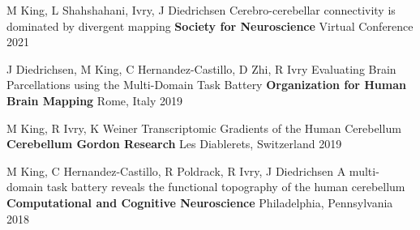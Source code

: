 \begin{cventries}

  \cventry
    {M King, L Shahshahani, Ivry, J Diedrichsen} %
    {Cerebro-cerebellar connectivity is dominated by divergent mapping} %
    {\textbf{Society for Neuroscience}} %
    {Virtual Conference} %
    {2021} %


  \cventry
    {J Diedrichsen, M King, C Hernandez-Castillo, D Zhi, R Ivry} %
    {Evaluating Brain Parcellations using the Multi-Domain Task Battery} %
    {\textbf{Organization for Human Brain Mapping}} %
    {Rome, Italy} %
    {2019} %
    
    
  \cventry
    {M King, R Ivry, K Weiner} %
    {Transcriptomic Gradients of the Human Cerebellum} %
    {\textbf{Cerebellum Gordon Research}} %
    {Les Diablerets, Switzerland} %
    {2019} %
    

  \cventry
    {M King, C Hernandez-Castillo, R Poldrack, R Ivry, J Diedrichsen} %
    {A multi-domain task battery reveals the functional topography of the human cerebellum} %
    {\textbf{Computational and Cognitive Neuroscience}} %
    {Philadelphia, Pennsylvania} %
    {2018} %
    

\end{cventries}
